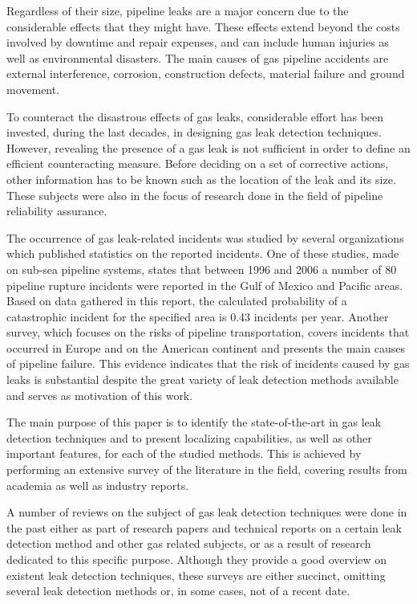 Regardless of their size, pipeline leaks are a major concern due to the considerable effects that they might have. These effects extend beyond the costs involved by downtime and repair expenses, and can include human injuries as well as environmental disasters. The main causes of gas pipeline accidents are external interference, corrosion, construction defects, material failure and ground movement.

To counteract the disastrous effects of gas leaks, considerable effort has been invested, during the last decades, in designing gas leak detection techniques. However, revealing the presence of a gas leak is not sufficient in order to define an efficient counteracting measure. Before deciding on a set of corrective actions, other information has to be known such as the location of the leak and its size. These subjects were also in the focus of research done in the field of pipeline reliability assurance.

The occurrence of gas leak-related incidents was studied by several organizations which published statistics on the reported incidents. One of these studies, made on sub-sea pipeline systems, states that between 1996 and 2006 a number of 80 pipeline rupture incidents were reported in the Gulf of Mexico and Pacific areas. Based on data gathered in this report, the calculated probability of a catastrophic incident for the specified area is 0.43 incidents per year. Another survey, which focuses on the risks of pipeline transportation, covers incidents that occurred in Europe and on the American continent and presents the main causes of pipeline failure. This evidence indicates that the risk of incidents caused by gas leaks is substantial despite the great variety of leak detection methods available and serves as motivation of this work.

The main purpose of this paper is to identify the state-of-the-art in gas leak detection techniques and to present localizing capabilities, as well as other important features, for each of the studied methods. This is achieved by performing an extensive survey of the literature in the field, covering results from academia as well as industry reports.

A number of reviews on the subject of gas leak detection techniques were done in the past either as part of research papers and technical reports on a certain leak detection method and other gas related subjects, or as a result of research dedicated to this specific purpose. Although they provide a good overview on existent leak detection techniques, these surveys are either succinct, omitting several leak detection methods or, in some cases, not of a recent date.

